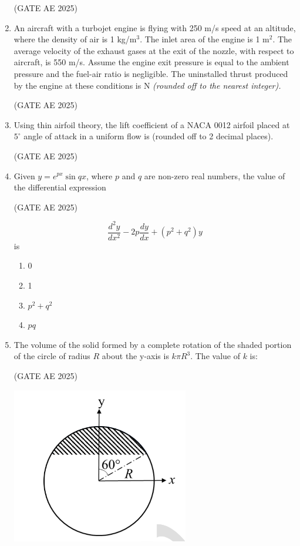 \documentclass[journal,12pt,onecolumn]{IEEEtran}
\theoremstyle{remark}
\begin{document}
\begin{flushleft}
\begin{enumerate}
\hfill (GATE AE 2025)

\item An aircraft with a turbojet engine is flying with 250 m/s speed at an altitude, where the density of air is 1 kg/m$^3$. The inlet area of the engine is 1 m$^2$. The average velocity of the exhaust gases at the exit of the nozzle, with respect to aircraft, is 550 m/s. Assume the engine exit pressure is equal to the ambient pressure and the fuel-air ratio is negligible. The uninstalled thrust produced by the engine at these conditions is \underline{\hspace{3cm}} N \textit{(rounded off to the nearest integer).}

\hfill (GATE AE 2025)

\item Using thin airfoil theory, the lift coefficient of a NACA 0012 airfoil placed at $5^\circ$ angle of attack in a uniform flow is \underline{\hspace{3cm}} (rounded off to 2 decimal places).

\hfill (GATE AE 2025)

\item  Given $y = e^{px} \sin qx$, where $p$ and $q$ are non-zero real numbers, the value of the differential expression

\hfill (GATE AE 2025)

\[
\frac{d^2y}{dx^2} - 2p \frac{dy}{dx} + (p^2 + q^2)y
\]
is
\begin{enumerate}
    \item 0
    \item 1
    \item $p^2 + q^2$
    \item $pq$
\end{enumerate}

\item  The volume of the solid formed by a complete rotation of the shaded portion of the circle of radius $R$ about the y-axis is $k \pi R^3$. The value of $k$ is:

\hfill (GATE AE 2025)

\begin{center}
\includegraphics[width=0.35\columnwidth]{figs/37.png}
\caption{}
    \label{fig:placeholder}
\end{center}


\end{enumerate}
\end{flushleft}
\end{document}
